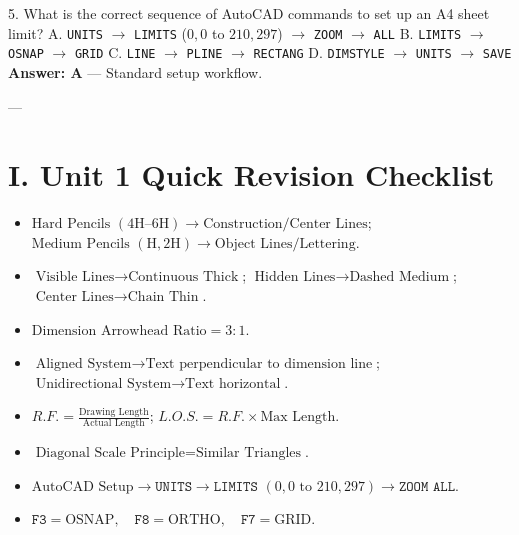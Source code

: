5. What is the correct sequence of AutoCAD commands to set up an A4 sheet limit?  
   A. \texttt{UNITS} $\to$ \texttt{LIMITS} ($0,0$ to $210,297$) $\to$ \texttt{ZOOM} $\to$ \texttt{ALL}  
   B. \texttt{LIMITS} $\to$ \texttt{OSNAP} $\to$ \texttt{GRID}  
   C. \texttt{LINE} $\to$ \texttt{PLINE} $\to$ \texttt{RECTANG}  
   D. \texttt{DIMSTYLE} $\to$ \texttt{UNITS} $\to$ \texttt{SAVE}  
   \textbf{Answer: A} — Standard setup workflow.

---

\section{I. Unit 1 Quick Revision Checklist}
\begin{revisionchecklist}
\begin{itemize}
    \item $\text{Hard Pencils } (4\text{H--}6\text{H}) \to \text{Construction/Center Lines}$; $\text{Medium Pencils } (\text{H}, 2\text{H}) \to \text{Object Lines/Lettering}$.
    \item $\text{Visible Lines} \to \text{Continuous Thick}$; $\text{Hidden Lines} \to \text{Dashed Medium}$; $\text{Center Lines} \to \text{Chain Thin}$.
    \item $\text{Dimension Arrowhead Ratio} = 3:1$.
    \item $\text{Aligned System} \to \text{Text perpendicular to dimension line}$; $\text{Unidirectional System} \to \text{Text horizontal}$.
    \item $R.F. = \frac{\text{Drawing Length}}{\text{Actual Length}}$; $L.O.S. = R.F. \times \text{Max Length}$.
    \item $\text{Diagonal Scale Principle} = \text{Similar Triangles}$.
    \item $\text{AutoCAD Setup} \to \texttt{UNITS} \to \texttt{LIMITS } (0,0 \text{ to } 210,297) \to \texttt{ZOOM ALL}$.
    \item $\texttt{F3} = \text{OSNAP}, \quad \texttt{F8} = \text{ORTHO}, \quad \texttt{F7} = \text{GRID}$.
\end{itemize}
\end{revisionchecklist}
